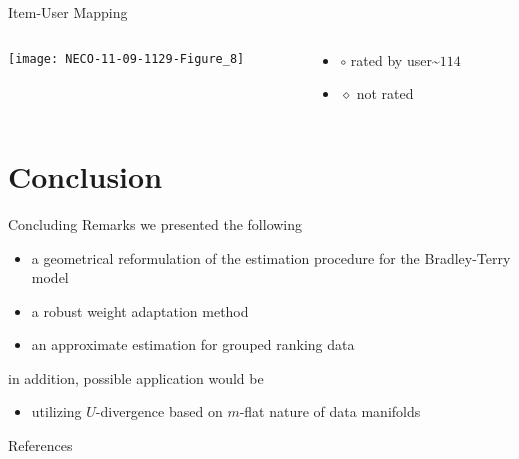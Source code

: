 \documentclass[fleqn,aspectratio=1610]{beamer}
\begin{document}
\begin{frame}[label={sec:org7c260bd}]{Item-User Mapping}
\begin{columns}
\begin{column}{0.6\columnwidth}
\begin{center}
  \texttt{[image: NECO-11-09-1129-Figure\_8]}%
\end{center}
\end{column}
\begin{column}{0.4\columnwidth}
\begin{itemize}
\item \(\circ\) rated by user\textasciitilde{}\(114\)
\item \(\diamond\) not rated
\end{itemize}
\end{column}
\end{columns}
\end{frame}


\section{Conclusion}
\label{sec:org35390e9}
\begin{frame}[label={sec:orga4bb9c6}]{Concluding Remarks}
we presented the following
\begin{itemize}
\item a geometrical reformulation of the estimation procedure 
for the Bradley-Terry model
\item a robust weight adaptation method
\item an approximate estimation for grouped ranking data
\end{itemize}

in addition, possible application would be
\begin{itemize}
\item utilizing \(U\)-divergence based on \(m\)-flat nature of data
manifolds
\end{itemize}
\end{frame}

\begin{frame}[allowframebreaks]{References}
\printbibliography[heading=none]
\end{frame}
\end{document}

